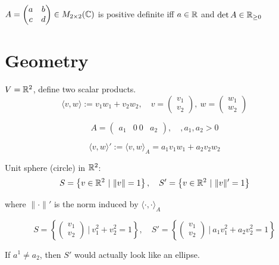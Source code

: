 \documentclass[12pt]{article}
\begin{document}
\begin{exercise}{}{}
    $A = \begin{pmatrix}
            a & b \\
            c & d
        \end{pmatrix} \in M_{2 \times 2}(\mathbb{C})
    $ is positive definite iff $a \in \mathbb{R}$ and $\det A \in \mathbb{R}_{\geq 0}$
\end{exercise}

\section{Geometry}

\begin{example}{}{}
    $V = \mathbb{R}^2$, define two scalar products.
    $$
        \langle v, w \rangle := v_1w_1 + v_2w_2, \quad v = \begin{pmatrix} v_1 \\ v_2 \end{pmatrix},\ w = \begin{pmatrix} w_1 \\  w_2 \end{pmatrix}
    $$

    $$
        A = \begin{pmatrix}
            a_1 & 0  \
            0 & a_2
        \end{pmatrix}, \quad, a_1, a_2 > 0
    $$

    $$
        \langle v, w \rangle' := \langle v, w \rangle_A = a_1v_1w_1 + a_2v_2w_2
    $$

    Unit sphere (circle) in $\mathbb{R}^2$: 
    $$
        S = \left\{v \in \mathbb{R}^2 \ |\ \lVert v \rVert = 1\right\}, \quad S' = \left\{v \in \mathbb{R}^2 \ |\ \lVert v \rVert' = 1\right\}
    $$

    where $\lVert \cdot \rVert'$ is the norm induced by $\langle \cdot, \cdot \rangle_A$

    $$
        S = \left\{\begin{pmatrix} v_1 \\ v_2 \end{pmatrix} \ \Big|\ v_1^2 + v_2^2 = 1\right\}, \quad S' = \left\{\begin{pmatrix} v_1 \\ v_2 \end{pmatrix} \ \Big|\ a_1v_1^2 + a_2v_2^2 = 1\right\}
    $$

    If $a^1 \neq a_2$, then $S'$ would actually look like an ellipse.
\end{example}
\end{document}
